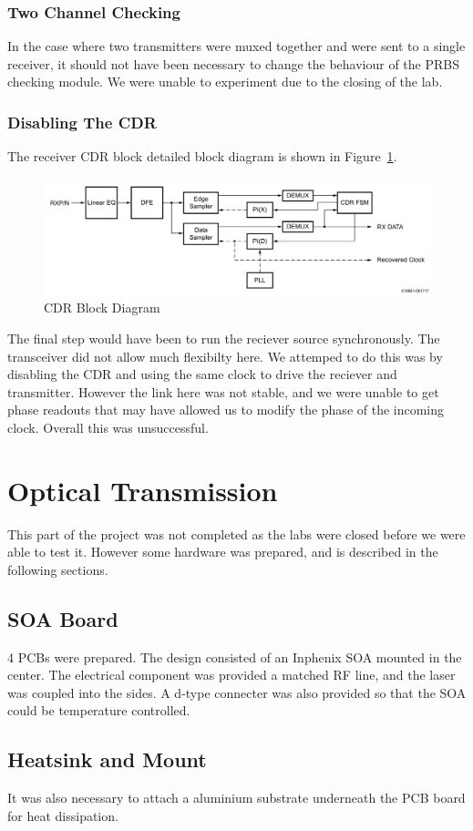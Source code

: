 \subsubsection{Two Channel Checking}%
\label{ssub:two_channel_checking}
In the case where two transmitters were muxed together and were sent to a
single receiver, it should not have been necessary to change the behaviour of
the PRBS checking module.
We were unable to experiment due to the closing of the lab.

\subsubsection{Disabling The CDR}%
\label{ssub:disabling_the_cdr}
The receiver CDR block detailed block diagram is shown in
Figure~\ref{fig:cdr_detail}.

\begin{figure}[ht]
    \centering
    \hspace*{-1cm}\includegraphics[width=1.2\linewidth]{img/cdr_detail}
    \caption{CDR Block Diagram}%
    \label{fig:cdr_detail}
\end{figure}

The final step would have been to run the reciever source synchronously. The
transceiver did not allow much flexibilty here. We attemped to do this was by
disabling the CDR and using the same clock to drive the reciever and
transmitter. However the link here was not stable, and we were unable to get
phase readouts that may have allowed us to modify the phase of the incoming
clock. Overall this was unsuccessful.


\section{Optical Transmission}%
\label{optical_transmission}
This part of the project was not completed as the labs were closed before we
were able to test it. However some hardware was prepared, and is described in
the following sections.

\subsection{SOA Board}%
\label{sub:soa_board}
4 PCBs were prepared. The design consisted of an Inphenix SOA mounted in the
center. The electrical component was provided a matched RF line, and the laser
was coupled into the sides. A d-type connecter was also provided so that the
SOA could be temperature controlled.


\subsection{Heatsink and Mount}%
\label{sub:heatsink_and_mount}
It was also necessary to attach a aluminium substrate underneath the PCB board
for heat dissipation. 




